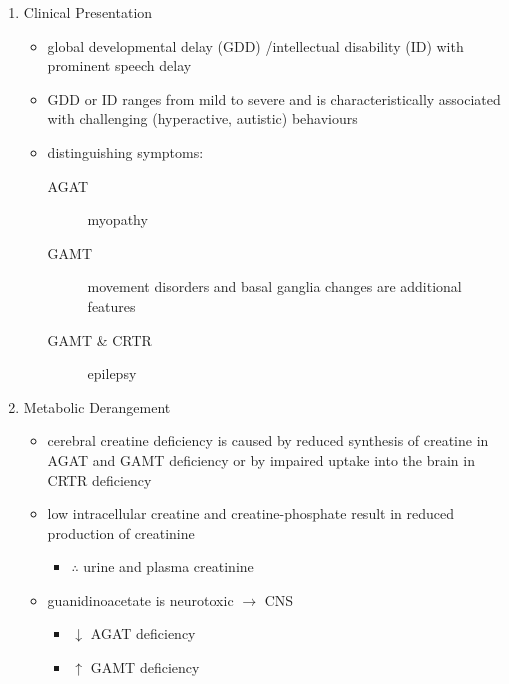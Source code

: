 \documentclass{scrartcl}
\begin{document}
\begin{enumerate}
\item Clinical Presentation
\label{sec:org1099c1f}
\begin{itemize}
\item global developmental delay (GDD) /intellectual disability (ID) with
prominent speech delay
\item GDD or ID ranges from mild to severe and is characteristically
associated with challenging (hyperactive, autistic) behaviours
\item distinguishing symptoms:
\begin{description}
\item[{AGAT}] myopathy
\item[{GAMT}] movement disorders and basal ganglia changes are
additional features
\item[{GAMT \& CRTR}] epilepsy
\end{description}
\end{itemize}

\item Metabolic Derangement
\label{sec:org0f19e29}
\begin{itemize}
\item cerebral creatine deficiency is caused by reduced synthesis of
creatine in AGAT and GAMT deficiency or by impaired uptake into the
brain in CRTR deficiency
\item low intracellular creatine and creatine-phosphate result in reduced
production of creatinine
\begin{itemize}
\item \(\therefore\) \low urine and plasma creatinine
\end{itemize}
\item guanidinoacetate is neurotoxic \(\to\) CNS
\begin{itemize}
\item \(\downarrow\) AGAT deficiency
\item \(\uparrow\) GAMT deficiency
\end{itemize}
\end{itemize}


\end{enumerate}
\end{document}
